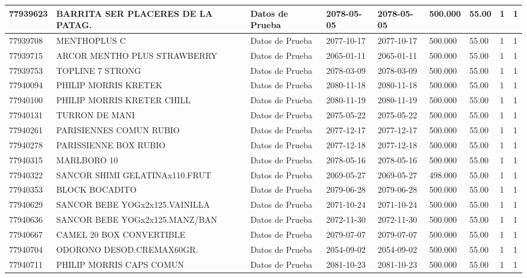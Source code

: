 \documentclass[a4paper,12pt]{article}
\begin{document}
\begin{landscape}
\begin{longtable}{|p{4cm}|p{2.5cm}|p{2.5cm}|p{1.8cm}|p{1.8cm}|p{1cm}|p{1cm}|p{3cm}|p{3cm}||}
77939623 & BARRITA SER PLACERES DE LA PATAG. & Datos de Prueba & 2078-05-05 & 2078-05-05 & 500.000 & 55.00 & 1 & 1 \\ \hline 
77939708 & MENTHOPLUS C & Datos de Prueba & 2077-10-17 & 2077-10-17 & 500.000 & 55.00 & 1 & 1 \\ \hline 
77939715 & ARCOR MENTHO PLUS STRAWBERRY & Datos de Prueba & 2065-01-11 & 2065-01-11 & 500.000 & 55.00 & 1 & 1 \\ \hline 
77939753 & TOPLINE 7 STRONG & Datos de Prueba & 2078-03-09 & 2078-03-09 & 500.000 & 55.00 & 1 & 1 \\ \hline 
77940094 & PHILIP MORRIS KRETEK & Datos de Prueba & 2080-11-18 & 2080-11-18 & 500.000 & 55.00 & 1 & 1 \\ \hline 
77940100 & PHILIP MORRIS KRETER CHILL & Datos de Prueba & 2080-11-19 & 2080-11-19 & 500.000 & 55.00 & 1 & 1 \\ \hline 
77940131 & TURRON DE MANI & Datos de Prueba & 2075-05-22 & 2075-05-22 & 500.000 & 55.00 & 1 & 1 \\ \hline 
77940261 & PARISIENNES COMUN RUBIO & Datos de Prueba & 2077-12-17 & 2077-12-17 & 500.000 & 55.00 & 1 & 1 \\ \hline 
77940278 & PARISSIENNE BOX RUBIO & Datos de Prueba & 2077-12-18 & 2077-12-18 & 500.000 & 55.00 & 1 & 1 \\ \hline 
77940315 & MARLBORO 10 & Datos de Prueba & 2078-05-16 & 2078-05-16 & 500.000 & 55.00 & 1 & 1 \\ \hline 
77940322 & SANCOR SHIMI GELATINAx110.FRUT & Datos de Prueba & 2069-05-27 & 2069-05-27 & 498.000 & 55.00 & 1 & 1 \\ \hline 
77940353 & BLOCK BOCADITO & Datos de Prueba & 2079-06-28 & 2079-06-28 & 500.000 & 55.00 & 1 & 1 \\ \hline 
77940629 & SANCOR BEBE YOGx2x125.VAINILLA & Datos de Prueba & 2071-10-24 & 2071-10-24 & 500.000 & 55.00 & 1 & 1 \\ \hline 
77940636 & SANCOR BEBE YOGx2x125.MANZ/BAN & Datos de Prueba & 2072-11-30 & 2072-11-30 & 500.000 & 55.00 & 1 & 1 \\ \hline 
77940667 & CAMEL 20 BOX CONVERTIBLE & Datos de Prueba & 2079-07-07 & 2079-07-07 & 500.000 & 55.00 & 1 & 1 \\ \hline 
77940704 & ODORONO DESOD.CREMAX60GR. & Datos de Prueba & 2054-09-02 & 2054-09-02 & 500.000 & 55.00 & 1 & 1 \\ \hline 
77940711 & PHILIP MORRIS CAPS COMUN & Datos de Prueba & 2081-10-23 & 2081-10-23 & 500.000 & 55.00 & 1 & 1 \\ \hline 

\end{longtable}
\end{landscape}
\end{document}
